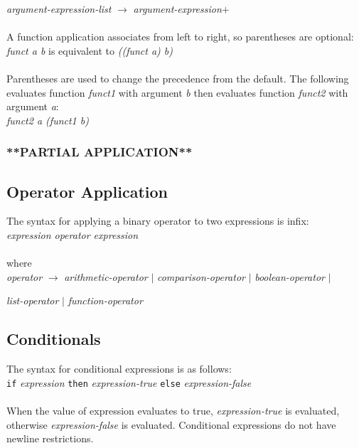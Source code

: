     \emph{argument-expression-list} $\rightarrow$ \emph{argument-expression}$+$ \\ \\ 
    A function application associates from left to right, so parentheses are optional: \\
    
    \emph{funct a b}  is equivalent to \emph{((funct a) b)} \\ \\
    Parentheses are used to change the precedence from the default. The following evaluates function \emph{funct1} with argument \emph{b} then 
    evaluates function \emph{funct2} with argument \emph{a}: \\
    
    \emph{funct2 a (funct1 b)}

  \subsubsection{**PARTIAL APPLICATION**}
  

\subsection{Operator Application}
  The syntax for applying a binary operator to two expressions is infix:\\

    \emph{expression  operator  expression}\\ \\
    where\\
    
    \emph{operator} $\rightarrow$ \emph{arithmetic-operator} $ | $  \emph{comparison-operator} $ | $ \emph{boolean-operator} $ | $ 
    
    \emph{list-operator} $ | $ \emph{function-operator}
    
\subsection{Conditionals}
  The syntax for conditional expressions is as follows: \\
  
  \texttt{if}  \emph{expression}  \texttt{then}  \emph{expression-true}  \texttt{else}  \emph{expression-false} \\ \\
  When the value of expression evaluates to true,  \emph{expression-true} is evaluated, otherwise  \emph{expression-false} is evaluated. Conditional expressions do not have newline restrictions.

